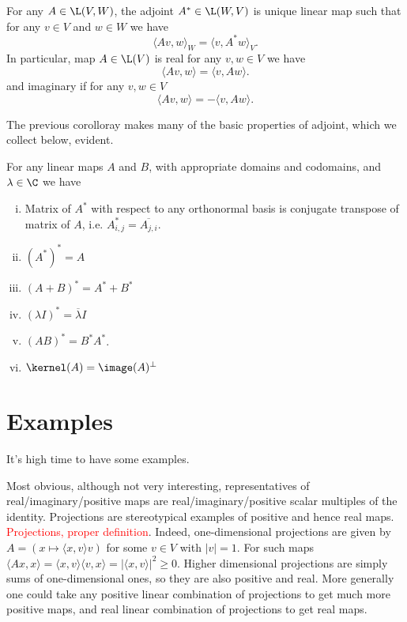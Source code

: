 \begin{kor}
	For any $A \in \L(V, W)$, the adjoint $A^{*} \in \L(W, V)$ is unique linear map such that for any $v \in V$ and $w \in W$ we have
	\[
		\langle A v, w \rangle_{W} = \langle v, A^{*} w \rangle_{V}.
	\]
	In particular, map $A \in \L(V)$ is real for any $v, w \in V$ we have
	\[
		\langle A v, w \rangle = \langle v, A w \rangle.
	\]
	and imaginary if for any $v, w \in V$
	\[
		\langle A v, w \rangle = -\langle v, A w \rangle.
	\]
\end{kor}

The previous corolloray makes many of the basic properties of adjoint, which we collect below, evident.

\begin{lause}\label{basic_adjoint}
	For any linear maps $A$ and $B$, with appropriate domains and codomains, and $\lambda \in \C$ we have
	\begin{enumerate}[i)]
		\item Matrix of $A^{*}$ with respect to any orthonormal basis is conjugate transpose of matrix of $A$, i.e. $A^{*}_{i, j} = \overline{A_{j, i}}$.
		\item $(A^{*})^{*} = A$
		\item $(A + B)^{*} = A^{*} + B^{*}$
		\item $(\lambda I)^{*} = \overline{\lambda} I$
		\item $(AB)^{*} = B^{*}A^{*}$.
		\item $\kernel(A) = \image(A)^{\perp}$
	\end{enumerate}
\end{lause}

\section{Examples}

It's high time to have some examples.

Most obvious, although not very interesting, representatives of real/imaginary/positive maps are real/imaginary/positive scalar multiples of the identity. Projections are stereotypical examples of positive and hence real maps. \textcolor{red}{Projections, proper definition}. Indeed, one-dimensional projections are given by $A = (x \mapsto \langle x, v \rangle v)$ for some $v \in V$ with $|v| = 1$. For such maps $\langle A x, x \rangle = \langle x, v \rangle \langle v, x \rangle = |\langle x, v \rangle|^{2} \geq 0$.
Higher dimensional projections are simply sums of one-dimensional ones, so they are also positive and real. More generally one could take any positive linear combination of projections to get much more positive maps, and real linear combination of projections to get real maps.

